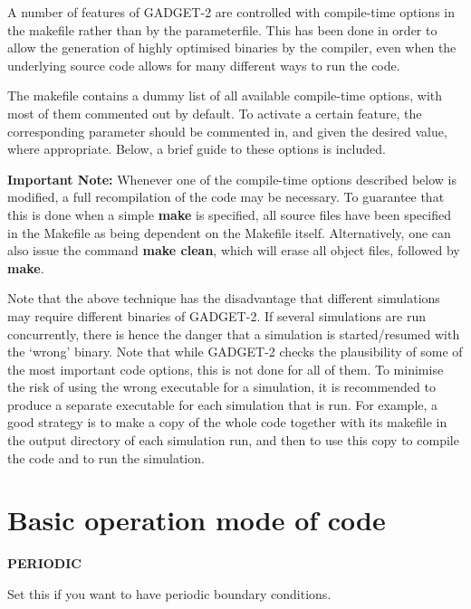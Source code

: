 \-A number of features of \-G\-A\-D\-G\-E\-T-\/2 are controlled with compile-\/time options in the makefile rather than by the parameterfile. \-This has been done in order to allow the generation of highly optimised binaries by the compiler, even when the underlying source code allows for many different ways to run the code.

\-The makefile contains a dummy list of all available compile-\/time options, with most of them commented out by default. \-To activate a certain feature, the corresponding parameter should be commented in, and given the desired value, where appropriate. \-Below, a brief guide to these options is included.

{\bfseries \-Important \-Note\-:} \-Whenever one of the compile-\/time options described below is modified, a full recompilation of the code may be necessary. \-To guarantee that this is done when a simple {\bfseries make} is specified, all source files have been specified in the \-Makefile as being dependent on the \-Makefile itself. \-Alternatively, one can also issue the command {\bfseries make clean}, which will erase all object files, followed by {\bfseries make}.

\-Note that the above technique has the disadvantage that different simulations may require different binaries of \-G\-A\-D\-G\-E\-T-\/2. \-If several simulations are run concurrently, there is hence the danger that a simulation is started/resumed with the `wrong' binary. \-Note that while \-G\-A\-D\-G\-E\-T-\/2 checks the plausibility of some of the most important code options, this is not done for all of them. \-To minimise the risk of using the wrong executable for a simulation, it is recommended to produce a separate executable for each simulation that is run. \-For example, a good strategy is to make a copy of the whole code together with its makefile in the output directory of each simulation run, and then to use this copy to compile the code and to run the simulation.

\par
 \hypertarget{Gadget-Makefile_secmake1}{}\section{\-Basic operation mode of code}\label{Gadget-Makefile_secmake1}

\begin{DoxyItemize}
\item {\bfseries \-P\-E\-R\-I\-O\-D\-I\-C} \par
 \-Set this if you want to have periodic boundary conditions.
\end{DoxyItemize}


